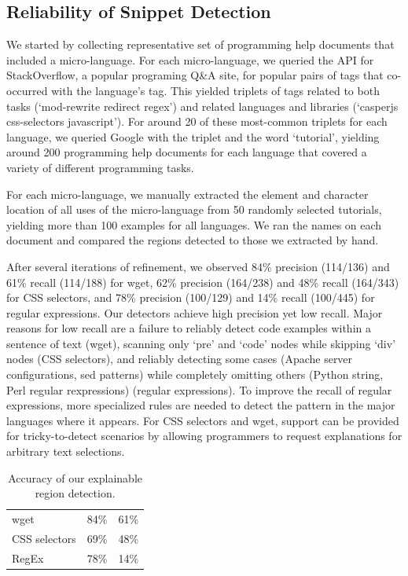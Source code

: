 \begin{changes}
\subsection{Reliability of Snippet Detection}

We started by collecting representative set of programming help documents that included a micro-language.  For each micro-language, we queried the API for StackOverflow, a popular programing Q\&A site, for popular pairs of tags that co-occurred with the language's tag.  This yielded triplets of tags related to both tasks (`mod-rewrite redirect regex') and related languages and libraries (`casperjs css-selectors javascript').  For around 20 of these most-common triplets for each language, we queried Google with the triplet and the word `tutorial', yielding around 200 programming help documents for each language that covered a variety of different programming tasks.

For each micro-language, we manually extracted the element and character location of all uses of the micro-language from 50 randomly selected tutorials, yielding more than 100 examples for all languages.  We ran the \glspl{name} on each document and compared the regions detected to those we extracted by hand. 

After several iterations of refinement, we observed 84\% precision (114/136) and 61\% recall (114/188) for wget, 62\% precision (164/238) and 48\% recall (164/343) for CSS selectors, and 78\% precision (100/129) and 14\% recall (100/445) for regular expressions.  Our detectors achieve high precision yet low recall.  Major reasons for low recall are a failure to reliably detect code examples within a sentence of text (wget), scanning only `pre' and `code' nodes while skipping `div' nodes (CSS selectors), and reliably detecting some cases (Apache server configurations, sed patterns) while completely omitting others (Python string, Perl regular rexpressions) (regular expressions).  To improve the recall of regular expressions, more specialized rules are needed to detect the pattern in the major languages where it appears.  For CSS selectors and wget, support can be provided for tricky-to-detect scenarios by allowing programmers to request explanations for arbitrary text selections.
\end{changes}
%
\begin{table}
\caption{Accuracy of our explainable region detection.}
\label{tab:detection_accuracy}
\centering
\begin{tabular}{llc}
\toprule
\headrow{Language} & \headrow{Precision} & \headrow{Recall} \\
\midrule
wget & 84\% & 61\% \\ \midrule
CSS selectors & 69\% & 48\% \\ \midrule
RegEx & 78\% & 14\% \\ \bottomrule
\end{tabular}
\end{table}
